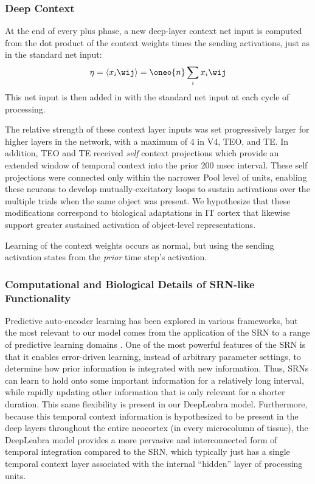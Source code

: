 \documentclass[12pt,twoside]{article}
\newif\myifpdf
\begin{document}
\subsubsection{Deep Context}

At the end of every plus phase, a new deep-layer context net input is computed from the dot product of the context weights times the sending activations, just as in the standard net input:
\begin{equation}
 \eta = \langle x_i \wij \rangle = \oneo{n} \sum_i x_i \wij
 \label{eq.net_in_ti}
\end{equation}
This net input is then added in with the standard net input at each cycle of processing.

The relative strength of these context layer inputs was set progressively larger for higher layers in the network, with a maximum of 4 in V4, TEO, and TE.  In addition, TEO and TE received {\em self} context projections which provide an extended window of temporal context into the prior 200 msec interval.  These self projections were connected only within the narrower Pool level of units, enabling these neurons to develop mutually-excitatory loops to sustain activations over the multiple trials when the same object was present.  We hypothesize that these modifications correspond to biological adaptations in IT cortex that likewise support greater sustained activation of object-level representations.

Learning of the context weights occurs as normal, but using the sending activation states from the {\em prior} time step's activation.

\subsubsection{Computational and Biological Details of SRN-like Functionality}

Predictive auto-encoder learning has been explored in various frameworks, but the most relevant to our model comes from the application of the SRN to a range of predictive learning domains \cite{Elman90,ElmanBatesKarmiloff-SmithEtAl96}.  One of the most powerful features of the SRN is that it enables error-driven learning, instead of arbitrary parameter settings, to determine how prior information is integrated with new information.  Thus, SRNs can learn to hold onto some important information for a relatively long interval, while rapidly updating other information that is only relevant for a shorter duration.  This same flexibility is present in our DeepLeabra model.  Furthermore, because this temporal context information is hypothesized to be present in the deep layers throughout the entire neocortex (in every microcolumn of tissue), the DeepLeabra model provides a more pervasive and interconnected form of temporal integration compared to the SRN, which typically just has a single temporal context layer associated with the internal ``hidden'' layer of processing units.
\end{document}
